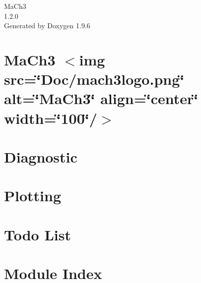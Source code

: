 \documentclass[twoside]{book}
\newcommand{\+}{\discretionary{\mbox{\scriptsize$\hookleftarrow$}}{}{}}
\newcommand{\clearemptydoublepage}{%
    \newpage{\pagestyle{empty}\cleardoublepage}%
  }
\begin{document}
  \raggedbottom
    \hypersetup{pageanchor=false,
                bookmarksnumbered=true,
                pdfencoding=unicode
               }
  \begin{titlepage}
  \vspace*{7cm}
  \begin{center}%
  {\Large Ma\+Ch3}\\
  [1ex]\large 1.\+2.\+0 \\
  \vspace*{1cm}
  {\large Generated by Doxygen 1.9.6}\\
  \end{center}
  \end{titlepage}
  \clearemptydoublepage
  \tableofcontents
  \clearemptydoublepage
  \hypersetup{pageanchor=true}
\chapter{Ma\+Ch3 \texorpdfstring{$<$}{<}img src=\char`\"{}\+Doc/mach3logo.\+png\char`\"{} alt=\char`\"{}\+Ma\+Ch3\char`\"{} align=\char`\"{}center\char`\"{} width=\char`\"{}100\char`\"{}/\texorpdfstring{$>$}{>}}
\label{md__home_runner_work_MaCh3_MaCh3_README}

\chapter{Diagnostic}
\label{md__home_runner_work_MaCh3_MaCh3_Diagnostics_README}

\chapter{Plotting}
\label{md__home_runner_work_MaCh3_MaCh3_plotting_README}

\chapter{Todo List}
\label{todo}

\chapter{Module Index}

\end{document}
